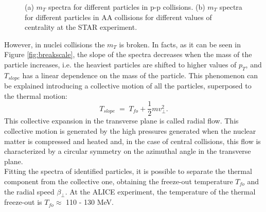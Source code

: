 \begin{figure}
  \centering
  \quad
  \caption{(a) $m_{T}$ spectra for different particles in p-p collisions. (b) $m_{T}$ spectra for different particles in AA collisions for different values of centrality at the STAR experiment.}
\end{figure}
%
However, in nuclei collisions the $m_{T}$ is broken. In facts, as it can be seen in Figure \ref{fig:breakscale}, the slope of the spectra decreases when the mass of the particle increases, i.e. the heaviest particles are shifted to higher values of $p_{T}$, and $T_{slope}$ has a linear dependence on the mass of the particle. This phenomenon can be explained introducing a collective motion of all the particles, superposed to the thermal motion:
\begin{equation}
 T_{slope}\;=\;T_{fo} + \frac{1}{2}mv_{\perp}^{2}.
\end{equation}
This collective expansion in the transverse plane is called radial flow. This collective motion is generated by the high pressures generated when the nuclear matter is compressed and heated and, in the case of central collisions, this flow is characterized by a circular symmetry on the azimuthal angle in the transverse plane.\\
Fitting the spectra of identified particles, it is possible to separate the thermal component from the collective one, obtaining the freeze-out temperature $T_{fo}$ and the radial speed $\beta_{\perp}$. At the ALICE experiment, the temperature of the thermal freeze-out is $T_{fo} \approx$ 110 - 130 MeV.\\
